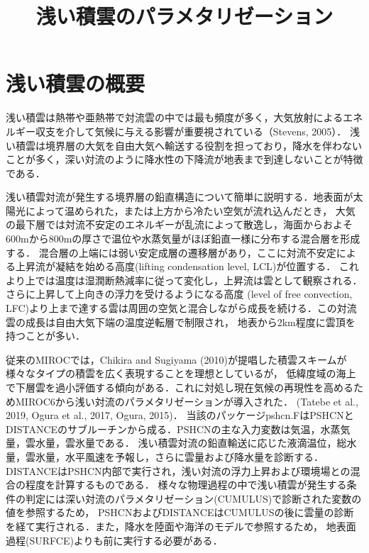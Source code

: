 \documentclass[platex, dvipdfmx]{jsarticle}
\title{浅い積雲のパラメタリゼーション}
\begin{document}
\maketitle

\section{浅い積雲の概要}
浅い積雲は熱帯や亜熱帯で対流雲の中では最も頻度が多く，大気放射によるエネルギー収支を介して気候に与える影響が重要視されている（Stevens, 2005）．
浅い積雲は境界層の大気を自由大気へ輸送する役割を担っており，降水を伴わないことが多く，深い対流のように降水性の下降流が地表まで到達しないことが特徴である．

浅い積雲対流が発生する境界層の鉛直構造について簡単に説明する．地表面が太陽光によって温められた，または上方から冷たい空気が流れ込んだとき，
大気の最下層では対流不安定のエネルギーが乱流によって散逸し，海面からおよそ600mから800mの厚さで温位や水蒸気量がほぼ鉛直一様に分布する混合層を形成する．
混合層の上端には弱い安定成層の遷移層があり，ここに対流不安定による上昇流が凝結を始める高度(lifting condensation level, LCL)が位置する．
これより上では温度は湿潤断熱減率に従って変化し，上昇流は雲として観察される．さらに上昇して上向きの浮力を受けるようになる高度
(level of free convection, LFC)より上まで達する雲は周囲の空気と混合しながら成長を続ける．この対流雲の成長は自由大気下端の温度逆転層で制限され，
地表から2km程度に雲頂を持つことが多い．


従来のMIROCでは，Chikira and Sugiyama (2010)が提唱した積雲スキームが様々なタイプの積雲を広く表現することを理想としているが，
低緯度域の海上で下層雲を過小評価する傾向がある．これに対処し現在気候の再現性を高めるためMIROC6から浅い対流のパラメタリゼーションが導入された．
(Tatebe et al., 2019, Ogura et al., 2017, Ogura, 2015)．
当該のパッケージpshcn.FはPSHCNとDISTANCEのサブルーチンから成る．PSHCNの主な入力変数は気温，水蒸気量，雲水量，雲氷量である．
浅い積雲対流の鉛直輸送に応じた液滴温位，総水量，雲氷量，水平風速を予報し，さらに雲量および降水量を診断する．
DISTANCEはPSHCN内部で実行され，浅い対流の浮力上昇および環境場との混合の程度を計算するものである．
様々な物理過程の中で浅い積雲が発生する条件の判定には深い対流のパラメタリゼーション(CUMULUS)で診断された変数の値を参照するため，
PSHCNおよびDISTANCEはCUMULUSの後に雲量の診断を経て実行される．また，降水を陸面や海洋のモデルで参照するため，
地表面過程(SURFCE)よりも前に実行する必要がある．
\end{document}

